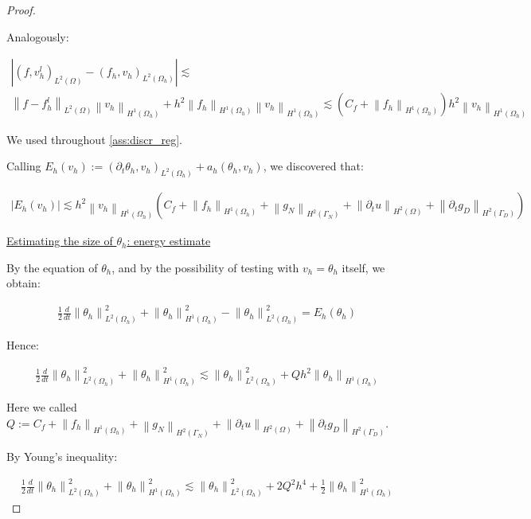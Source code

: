 \documentclass[english,a4paper,10pt,oneside]{scrbook}	%
\theoremstyle{break}
\newenvironment{mproof}[1][\proofname]{%
  \begin{proof}[#1]$ $\par\nobreak\ignorespaces
}{%
  \end{proof}
}
\renewcommand*{\proofname}{Proof}
\theoremstyle{remark}
\newcommand{\norm}[1]{\left\lVert#1\right\rVert}
\begin{document}
\begin{mproof}
Analogously:

\begin{align*}
	|(f, v_h^l)_{L^2(\Omega)} - (f_h, v_h)_{L^2(\Omega_h)}|\lesssim\\
	\norm{f-f_h^l}_{L^2(\Omega)}\norm{v_h}_{H^1(\Omega_h)} + h^2 \norm{f_h}_{H^1(\Omega_h)}\norm{v_h}_{H^1(\Omega_h)}\lesssim (C_f + \norm{f_h}_{H^1(\Omega_h)}) h^2 \norm{v_h}_{H^1(\Omega_h)}
\end{align*}

We used throughout \cref{ass:discr_reg}.

Calling $E_h(v_h):=(\partial_t \theta_h , v_h)_{L^2(\Omega_h)} + a_h(\theta_h, v_h)$, we discovered that:

\begin{align}
\label{eqn:theta_residual}
	|E_h(v_h)|\lesssim h^2 \norm{v_h}_{H^1(\Omega_h)} (C_f + \norm{f_h}_{H^1(\Omega_h)} + \norm{g_N}_{H^2(\Gamma_N)} + \norm{\partial_t u}_{H^2(\Omega)} + \norm{\partial_t g_D}_{H^2(\Gamma_D)} )
\end{align}

\underline{Estimating the size of $\theta_h$: energy estimate}

By the equation of $\theta_h$, and by the possibility of testing with $v_h = \theta_h$ itself, we obtain:

\begin{align*}
	\frac{1}{2} \frac{d}{dt} \norm{\theta_h}_{L^2(\Omega_h)}^2 + \norm{\theta_h}^2_{H^1(\Omega_h)} - \norm{\theta_h}^2_{L^2(\Omega_h)} = E_h(\theta_h)
\end{align*}

Hence:

\begin{align*}
	\frac{1}{2} \frac{d}{dt} \norm{\theta_h}_{L^2(\Omega_h)}^2 + \norm{\theta_h}^2_{H^1(\Omega_h)} \lesssim \norm{\theta_h}^2_{L^2(\Omega_h)}  + Qh^2\norm{\theta_h}_{H^1(\Omega_h)}
\end{align*}

Here we called $Q:=C_f + \norm{f_h}_{H^1(\Omega_h)} + \norm{g_N}_{H^2(\Gamma_N)} + \norm{\partial_t u}_{H^2(\Omega)} + \norm{\partial_t g_D}_{H^2(\Gamma_D)}$.

By Young's inequality:

\begin{align*}
	\frac{1}{2} \frac{d}{dt} \norm{\theta_h}_{L^2(\Omega_h)}^2 + \norm{\theta_h}^2_{H^1(\Omega_h)} \lesssim \norm{\theta_h}^2_{L^2(\Omega_h)}  + 2Q^2h^4 + \frac{1}{2}\norm{\theta_h}_{H^1(\Omega_h)}^2
\end{align*}


\end{mproof}
\end{document}
